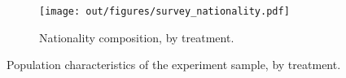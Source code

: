 \begin{figure}
    \ContinuedFloat
    \centering
    \begin{subfigure}[b]{\textwidth}
        \centering
        \texttt{[image: out/figures/survey\_nationality.pdf]}
        \caption{Nationality composition, by treatment.}
        \label{fig:survey_nationality}
    \end{subfigure}
    \caption{Population characteristics of the experiment sample, by treatment.}
    \label{fig:balance_cont}
\end{figure}
